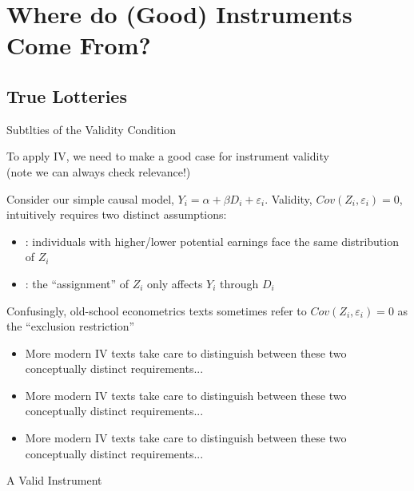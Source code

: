 \documentclass{beamer}
\begin{document}

\section{Where do (Good) Instruments Come From?}

\subsection{True Lotteries}
\begin{frame}{Subtlties of the Validity Condition}

To apply IV, we need to make a good case for instrument validity \\ (note we can always check relevance!)\pause
\medskip

Consider our simple causal model, $Y_i=\alpha+\beta D_i+\varepsilon_i$. Validity, $Cov(Z_i,\varepsilon_i)=0$, intuitively requires two distinct assumptions:\pause
\begin{itemize}
  \item {}: individuals with higher/lower potential earnings face the same distribution of $Z_i$
  \item {}: the ``assignment'' of $Z_i$ only affects $Y_i$ through $D_i$
\end{itemize}
\medskip\pause

Confusingly, old-school econometrics texts sometimes refer to $Cov(Z_i,\varepsilon_i)=0$ as the ``exclusion restriction''
\pause
\begin{itemize}
  \item More modern IV texts take care to distinguish between these two conceptually distinct requirements... 
\item More modern IV texts take care to distinguish between these two conceptually distinct requirements... 
  \item More modern IV texts take care to distinguish between these two conceptually distinct requirements... 
\end{itemize}

\end{frame}

\begin{frame}{A Valid Instrument}
  \begin{adjustbox}{width = 0.7\textwidth, center}
  \end{adjustbox}
\end{frame}
\end{document}
